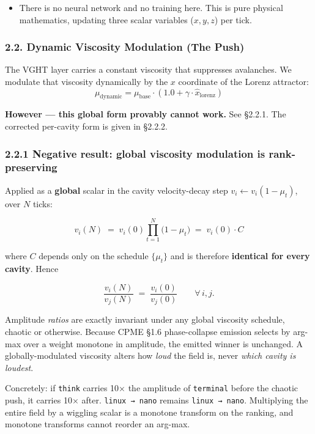 \documentclass[
  11pt,
  a4paper,
]{article}
\providecommand{\tightlist}{%
  \setlength{\itemsep}{0pt}\setlength{\parskip}{0pt}}
\begin{document}
\begin{itemize}
\tightlist
\item
  There is no neural network and no training here. This is pure physical
  mathematics, updating three scalar variables (\(x, y, z\)) per tick.
\end{itemize}

\subsubsection{2.2. Dynamic Viscosity Modulation (The
Push)}\label{dynamic-viscosity-modulation-the-push}

The VGHT layer carries a constant viscosity that suppresses avalanches.
We modulate that viscosity dynamically by the \(x\) coordinate of the
Lorenz attractor:
\[ \mu_{\text{dynamic}} = \mu_{\text{base}} \cdot (1.0 + \gamma \cdot \hat{x}_{\text{lorenz}}) \]

\textbf{However --- this global form provably cannot work.} See §2.2.1.
The corrected per-cavity form is given in §2.2.2.

\subsubsection{2.2.1 Negative result: global viscosity modulation is
rank-preserving}\label{negative-result-global-viscosity-modulation-is-rank-preserving}

Applied as a \textbf{global} scalar in the cavity velocity-decay step
\(v_i \leftarrow v_i(1 - \mu_t)\), over \(N\) ticks:

\[ v_i(N) \;=\; v_i(0) \prod_{t=1}^{N}\bigl(1 - \mu_t\bigr) \;=\; v_i(0)\cdot C \]

where \(C\) depends only on the schedule \(\{\mu_t\}\) and is therefore
\textbf{identical for every cavity}. Hence

\[ \frac{v_i(N)}{v_j(N)} \;=\; \frac{v_i(0)}{v_j(0)} \qquad \forall\, i,j. \]

Amplitude \emph{ratios} are exactly invariant under any global viscosity
schedule, chaotic or otherwise. Because CPME §1.6 phase-collapse
emission selects by arg-max over a weight monotone in amplitude, the
emitted winner is unchanged. A globally-modulated viscosity alters how
\emph{loud} the field is, never \emph{which cavity is loudest}.

Concretely: if \texttt{think} carries 10× the amplitude of
\texttt{terminal} before the chaotic push, it carries 10× after.
\texttt{linux\ →\ nano} remains \texttt{linux\ →\ nano}. Multiplying the
entire field by a wiggling scalar is a monotone transform on the
ranking, and monotone transforms cannot reorder an arg-max.
\end{document}
